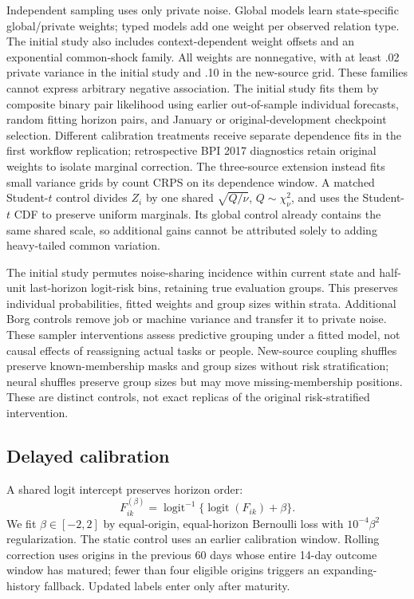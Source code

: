 Independent sampling uses only private noise. Global models learn
state-specific global/private weights; typed models add one weight per
observed relation type. The initial study also includes context-dependent
weight offsets and an exponential common-shock family. All weights are
nonnegative, with at least .02 private variance in the initial study and .10
in the new-source grid. These families cannot express arbitrary negative
association. The initial study fits them by composite binary pair
likelihood using earlier out-of-sample individual forecasts, random fitting
horizon pairs, and January or original-development checkpoint selection.
Different calibration treatments receive separate dependence fits in the
first workflow replication; retrospective BPI 2017 diagnostics retain original weights
to isolate marginal correction. The three-source extension instead fits small
variance grids by count CRPS on its dependence window. A matched Student-$t$
control divides $Z_i$ by one shared $\sqrt{Q/\nu}$, $Q\sim\chi^2_\nu$, and
uses the Student-$t$ CDF to preserve uniform marginals. Its global control
already contains the same shared scale, so additional gains cannot be
attributed solely to adding heavy-tailed common variation.

The initial study permutes noise-sharing incidence within current state and half-unit
last-horizon logit-risk bins, retaining true evaluation groups. This preserves
individual probabilities, fitted weights and group sizes within strata.
Additional Borg controls remove job or machine variance and transfer it to
private noise. These sampler interventions assess predictive grouping under a
fitted model, not causal effects of reassigning actual tasks or people.
New-source coupling shuffles preserve known-membership masks and group sizes
without risk stratification; neural shuffles preserve group sizes but may move
missing-membership positions. These are distinct controls, not exact replicas
of the original risk-stratified intervention.

\subsection{Delayed calibration}
A shared logit intercept preserves horizon order:
\begin{equation}
 F_{ik}^{(\beta)}=\operatorname{logit}^{-1}
 \{\operatorname{logit}(F_{ik})+\beta\}.
\end{equation}
We fit $\beta\in[-2,2]$ by equal-origin, equal-horizon Bernoulli loss with
$10^{-4}\beta^2$ regularization. The static control uses an earlier calibration
window. Rolling correction uses origins in the previous 60 days whose entire
14-day outcome window has matured; fewer than four eligible origins triggers
an expanding-history fallback. Updated labels enter only after maturity.

